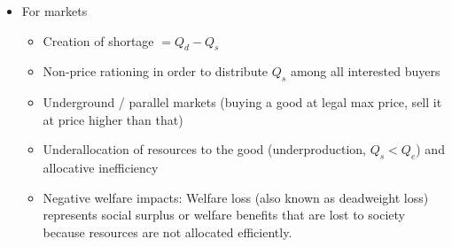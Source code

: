 \documentclass[a4paper,12pt]{article}
\begin{document}
\begin{itemize}
  \item For markets
  \begin{itemize}
    \item Creation of shortage $=Q_d-Q_s$
    \item Non-price rationing in order to distribute $Q_s$ among all interested buyers
    \item Underground / parallel markets (buying a good at legal max price, sell it at price higher than that)
    \item Underallocation of resources to the good (underproduction, $Q_s<Q_e$) and allocative inefficiency
    \item Negative welfare impacts: Welfare loss (also known as deadweight loss) represents social surplus or welfare benefits that are lost to society because resources are not allocated efficiently.


\end{itemize}
\end{itemize}
\end{document}
